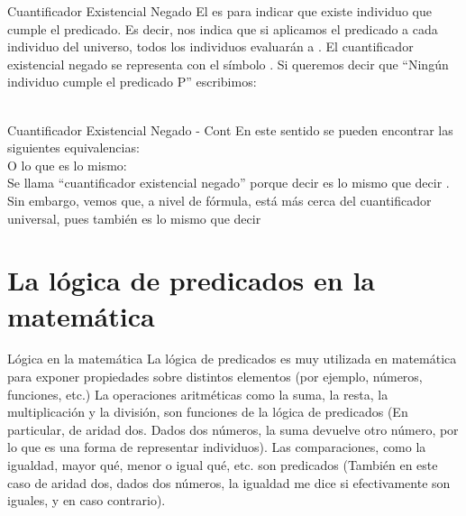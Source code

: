 
\begin{frame}{Cuantificador Existencial Negado}
  El  es para indicar que 
  existe  individuo que cumple el predicado.
  \jump
  Es decir, nos indica que si aplicamos el predicado a cada individuo del universo,
  todos los individuos evaluarán a \fullfalse.
  \jump
  El cuantificador existencial negado se representa con el símbolo .
  \jump
  Si queremos decir que ``Ningún individuo cumple el predicado P'' escribimos:\\
  \\
\end{frame}


\begin{frame}{Cuantificador Existencial Negado - Cont}
  En este sentido se pueden encontrar las siguientes equivalencias:\\
  \jump
  O lo que es lo mismo:\\
  \jump
  Se llama ``cuantificador existencial negado'' porque decir 
  es lo mismo que decir .
  \jump
  Sin embargo, vemos que, a nivel de fórmula, está más cerca del cuantificador
  universal, pues también es lo mismo que decir 
\end{frame}


\section{La lógica de predicados en la matemática}


\begin{frame}{Lógica en la matemática}
  La lógica de predicados es muy utilizada en matemática para exponer propiedades
  sobre distintos elementos (por ejemplo, números, funciones, etc.)
  \jump
  La operaciones aritméticas como la suma, la resta, la multiplicación y la división,
  son funciones de la lógica de predicados (En particular, de aridad dos. Dados
  dos números, la suma devuelve otro número, por lo que es una forma de representar
  individuos).
  \jump
  Las comparaciones, como la igualdad, mayor qué, menor o igual qué, etc. son
  predicados (También en este caso de aridad dos, dados dos números, la igualdad
  me dice \fulltrue si efectivamente son iguales, y \fullfalse en caso contrario).
\end{frame}

